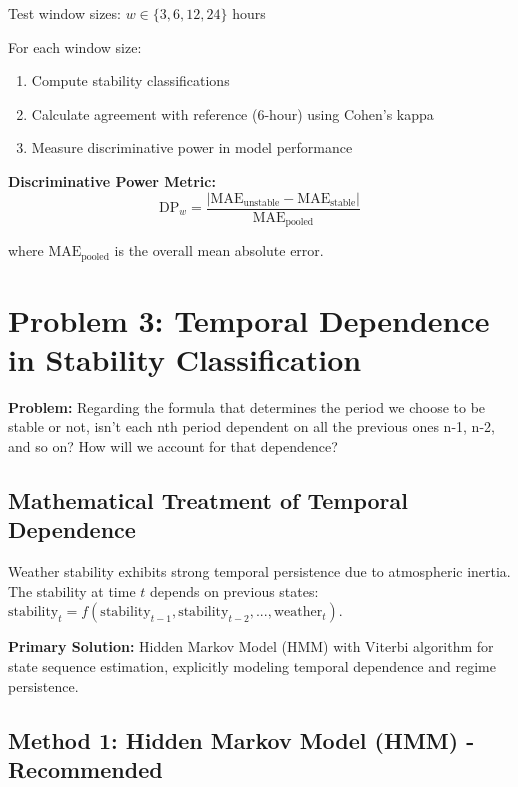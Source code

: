 \documentclass[11pt,a4paper]{article}
\begin{document}
Test window sizes: $w \in \{3, 6, 12, 24\}$ hours

For each window size:
\begin{enumerate}
    \item Compute stability classifications
    \item Calculate agreement with reference (6-hour) using Cohen's kappa
    \item Measure discriminative power in model performance
\end{enumerate}

\textbf{Discriminative Power Metric:}
\begin{equation}
\text{DP}_w = \frac{|\text{MAE}_{\text{unstable}} - \text{MAE}_{\text{stable}}|}{\text{MAE}_{\text{pooled}}}
\end{equation}

where $\text{MAE}_{\text{pooled}}$ is the overall mean absolute error.

\section{Problem 3: Temporal Dependence in Stability Classification}

\begin{problembox}
\textbf{Problem:} Regarding the formula that determines the period we choose to be stable or not, isn't each nth period dependent on all the previous ones n-1, n-2, and so on? How will we account for that dependence?
\end{problembox}

\subsection{Mathematical Treatment of Temporal Dependence}

Weather stability exhibits strong temporal persistence due to atmospheric inertia. The stability at time $t$ depends on previous states: $\text{stability}_t = f(\text{stability}_{t-1}, \text{stability}_{t-2}, ..., \text{weather}_t)$.

\begin{solutionbox}
\textbf{Primary Solution:} Hidden Markov Model (HMM) with Viterbi algorithm for state sequence estimation, explicitly modeling temporal dependence and regime persistence.
\end{solutionbox}

\subsection{Method 1: Hidden Markov Model (HMM) - Recommended}
\end{document}
